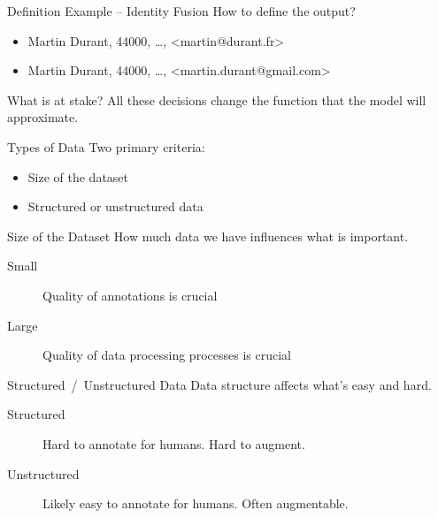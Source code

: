 \begin{frame}{Definition Example – Identity Fusion}
  How to define the output?
  \begin{itemize}
    \item Martin Durant, 44000, …, <martin@durant.fr>
    \item Martin Durant, 44000, …, <martin.durant@gmail.com>
  \end{itemize}

  \hugo
\end{frame}


\begin{frame}{What is at stake?}
  All these decisions change the function that the model will approximate.

  \hugo
\end{frame}


\begin{frame}{Types of Data}
  Two primary criteria:
  \begin{itemize}
    \item Size of the dataset
    \item Structured or unstructured data
  \end{itemize}

  \hugo
\end{frame}


\begin{frame}{Size of the Dataset}
  How much data we have influences what is important.

  \begin{description}
    \item[Small] Quality of annotations is crucial
    \item[Large] Quality of data processing processes is crucial
  \end{description}

  \bigskip

  \hugo
\end{frame}


\begin{frame}{Structured~/~Unstructured Data}
  Data structure affects what's easy and hard.

  \begin{description}
    \item[Structured] Hard to annotate for humans. Hard to augment.
    \item[Unstructured] Likely easy to annotate for humans. Often augmentable.
  \end{description}

  \hugo
\end{frame}



